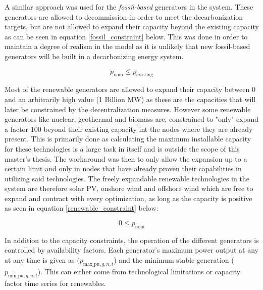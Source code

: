 \documentclass[preprint,12pt,nopreprintline]{elsarticle}
\begin{document}
\medskip
\noindent
A similar approach was used for the \textit{fossil-based} generators in the system. These generators are allowed to decommission in order to meet the decarbonization targets, but are not allowed to expand their capacity beyond the existing capacity as can be seen in equation \eqref{fossil_constraint} below. This was done in order to maintain a degree of realism in the model as it is unlikely that new fossil-based generators will be built in a decarbonizing energy system.

\begin{equation}
p_{\text{nom}} \leq p_{\text{existing}}
\label{fossil_constraint}
\end{equation}

\medskip
\noindent
Most of the renewable generators are allowed to expand their capacity between 0 and an arbitrarily high value (1 Billion MW) as these are the capacities that will later be constrained by the decentralization measures. However some renewable generators like nuclear, geothermal and biomass are, constrained to "only" expand a factor 100 beyond their existing capacity int the nodes where they are already present. This is primarily done as calculating the maximum installable capacity for these technologies is a large task in itself and is outside the scope of this master's thesis. The workaround was then to only allow the expansion up to a certain limit and only in nodes that have already proven their capabilities in utilizing said technologies. The freely expandable renewable technologies in the system are therefore solar PV, onshore wind and offshore wind which are free to expand and contract with every optimization, as long as the capacity is positive as seen in equation \eqref{renewable_constraint} below:

\begin{equation}
0 \leq p_{\text{nom}}
\label{renewable_constraint}
\end{equation}

\medskip
\noindent
\noindent
In addition to the capacity constraints, the operation of the different generators is controlled by availability factors. Each generator's maximum power output at any at any time is given as ($p_{\text{max\_pu},g,n,t}$) and the minimum stable generation ($p_{\text{min\_pu},g,n,t}$). This can either come from technological limitations or capacity factor time series for renewables.
\end{document}
